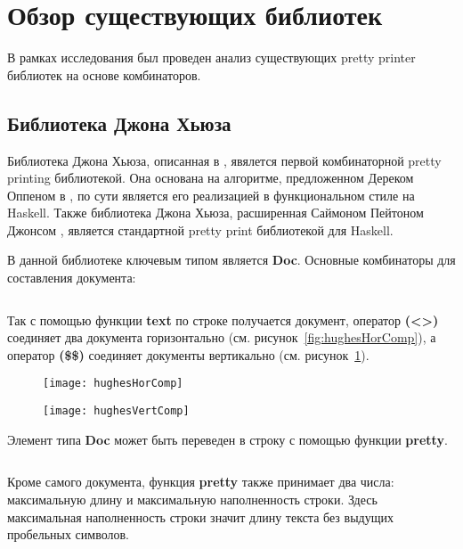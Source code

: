 \section{Обзор существующих библиотек}

В рамках исследования был проведен анализ существующих pretty printer библиотек на основе комбинаторов.

\subsection{Библиотека Джона Хьюза}

Библиотека Джона Хьюза, описанная в \cite{hughes}, явялется первой комбинаторной pretty printing библиотекой. Она основана на алгоритме, предложенном Дереком Оппеном в \cite{oppen}, по сути является его реализацией в функциональном стиле на Haskell. Также библиотека Джона Хьюза, расширенная Саймоном Пейтоном Джонсом \cite{peytonJones}, является стандартной pretty print библиотекой для Haskell.


В данной библиотеке ключевым типом является \textbf{Doc}. Основные комбинаторы для составления документа:
\inputminted{haskell}{codes/hughesBasicOperators.hs}

Так с помощью функции \textbf{text} по строке получается документ, оператор \textbf{(<>)} соединяет два документа горизонтально (см. рисунок~\ref{fig:hughesHorComp}), а оператор \textbf{(\$\$)} соединяет документы вертикально (см. рисунок~\ref{fig:hughesVertComp}).

\begin{figure}[h!]
	\begin{minipage}[b]{0.45\linewidth}
		\centering
		\texttt{[image: hughesHorComp]}
		\caption{}
		\label{fig:hughesHorComp}
	\end{minipage}
	\hspace{0.5cm}
	\begin{minipage}[b]{0.45\linewidth}
		\centering
		\texttt{[image: hughesVertComp]}
		\caption{}
		\label{fig:hughesVertComp}
	\end{minipage}
\end{figure}

Элемент типа \textbf{Doc} может быть переведен в строку с помощью функции \textbf{pretty}.
\inputminted{haskell}{codes/hughesPretty.hs}
Кроме самого документа, функция \textbf{pretty} также принимает два числа: максимальную длину и максимальную наполненность строки. Здесь максимальная наполненность строки значит длину текста без выдущих пробельных символов.

